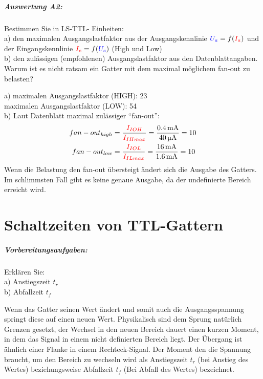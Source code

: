 \documentclass[a4paper,titlepage,parskip]{scrreprt}
\newcommand{\spannung}[1]{\textcolor{blue}{#1}}
\newcommand{\strom}[1]{\textcolor{red}{#1}}
\begin{document}
        \paragraph{Auswertung A2:} Bestimmen Sie in LS-TTL- Einheiten:\\
          a) den maximalen Ausgangslastfaktor aus der Ausgangskennlinie $\spannung{U_a} = f(\strom{I_a})$ und der Eingangskennlinie $\strom{I_e} = f(\spannung{U_e})$ (High und Low)\\
          b) den zulässigen (empfohlenen) Ausgangslastfaktor aus den Datenblattangaben.
          Warum ist es nicht ratsam ein Gatter mit dem maximal möglichem fan-out zu belasten?

          a)  maximalen Ausgangslastfaktor (HIGH): 23\\
              maximalen Ausgangslastfaktor (LOW): 54\\
          b) Laut Datenblatt maximal zulässiger "`fan-out"':
              \begin{align*}
                  fan-out_{high} &= \frac{\strom{I_{IOH}}}{\strom{I_{IHmax}}} = \frac{\SI{0,4}{\milli\ampere}}{\SI{40}{\micro\ampere}} = 10\\
                  fan-out_{low} &= \frac{\strom{I_{IOL}}}{\strom{I_{ILmax}}} = \frac{\SI{16}{\milli\ampere}}{\SI{1,6}{\milli\ampere}} = 10
              \end{align*}
             Wenn die Belastung den fan-out übersteigt ändert sich die Ausgabe des Gatters. Im schlimmsten Fall gibt es keine genaue Ausgabe, da der undefinierte Bereich erreicht wird.
             
  \chapter{Schaltzeiten von TTL-Gattern}
    \paragraph{Vorbereitungsaufgaben:} Erklären Sie:\\a) Anstiegszeit \textbf{$t_r$}\\b) Abfallzeit \textbf{$t_f$}

      Wenn das Gatter seinen Wert ändert und somit auch die Ausgangsspannung springt diese auf einen neuen Wert. Physikalisch sind dem Sprung natürlich Grenzen gesetzt, der Wechsel in den neuen Bereich dauert einen kurzen Moment, in dem das Signal in einem nicht definierten Bereich liegt. Der Übergang ist ähnlich einer Flanke in einem Rechteck-Signal. Der Moment den die Spannung braucht, um den Bereich zu wechseln wird als Anstiegszeit  \textbf{$t_r$} (bei Anstieg des Wertes) beziehungsweise Abfallzeit \textbf{$t_f$} (Bei Abfall des Wertes) bezeichnet.
\end{document}
